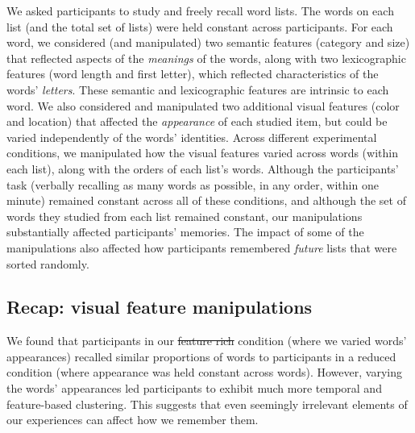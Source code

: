 \documentclass[11pt]{article}
\providecommand{\DIFaddtex}[1]{{\protect\color{blue}\uwave{#1}}} %
\providecommand{\DIFdeltex}[1]{{\protect\color{red}\sout{#1}}}                      %
\providecommand{\DIFaddbegin}{} %
\providecommand{\DIFaddend}{} %
\providecommand{\DIFdelbegin}{} %
\providecommand{\DIFdelend}{} %
\providecommand{\DIFadd}[1]{\texorpdfstring{\DIFaddtex{#1}}{#1}} %
\providecommand{\DIFdel}[1]{\texorpdfstring{\DIFdeltex{#1}}{}} %
\newcommand{\DIFscaledelfig}{0.5}
\newlength{\DIFdelgraphicswidth} %
\newlength{\DIFdelgraphicsheight} %
\newcommand{\DIFaddincludegraphics}[2][]{{\color{blue}\fbox{\DIFOincludegraphics[#1]{#2}}}} %
\newcommand{\DIFdelincludegraphics}[2][]{%
\sbox{\DIFdelgraphicsbox}{\DIFOincludegraphics[#1]{#2}}%
\settoboxwidth{\DIFdelgraphicswidth}{\DIFdelgraphicsbox} %
\settoboxtotalheight{\DIFdelgraphicsheight}{\DIFdelgraphicsbox} %
\scalebox{\DIFscaledelfig}{%
\parbox[b]{\DIFdelgraphicswidth}{\usebox{\DIFdelgraphicsbox}\\[-\baselineskip] \rule{\DIFdelgraphicswidth}{0em}}\llap{\resizebox{\DIFdelgraphicswidth}{\DIFdelgraphicsheight}{%
\setlength{\unitlength}{\DIFdelgraphicswidth}%
\begin{picture}(1,1)%
\thicklines\linethickness{2pt} %
{\color[rgb]{1,0,0}\put(0,0){\framebox(1,1){}}}%
{\color[rgb]{1,0,0}\put(0,0){\line( 1,1){1}}}%
{\color[rgb]{1,0,0}\put(0,1){\line(1,-1){1}}}%
\end{picture}%
}\hspace*{3pt}}} %
} %
\DeclareRobustCommand{\DIFaddbegin}{\DIFOaddbegin \let\includegraphics\DIFaddincludegraphics} %
\DeclareRobustCommand{\DIFaddend}{\DIFOaddend \let\includegraphics\DIFOincludegraphics} %
\DeclareRobustCommand{\DIFdelbegin}{\DIFOdelbegin \let\includegraphics\DIFdelincludegraphics} %
\DeclareRobustCommand{\DIFdelend}{\DIFOaddend \let\includegraphics\DIFOincludegraphics} %
\begin{document}

We asked participants to study and freely recall word lists. The words on each
list (and the total set of lists) were held constant across participants. For
each word, we considered (and manipulated) two semantic features (category and
size) that reflected aspects of the \textit{meanings} of the words, along with
two lexicographic features (word length and first letter), which reflected
characteristics of the words' \textit{letters}. These semantic and
lexicographic features are intrinsic to each word. We also considered and
manipulated two additional visual features (color and location) that affected
the \textit{appearance} of each studied item, but could be varied independently
of the words' identities. Across different experimental conditions, we
manipulated how the visual features varied across words (within each list),
along with the orders of each list's words. Although the participants' task
(verbally recalling as many words as possible, in any order, within one minute)
remained constant across all of these conditions, and although the set of words
they studied from each list remained constant, our manipulations substantially
affected participants' memories. The impact of some of the manipulations also
affected how participants remembered \textit{future} lists that were sorted
randomly.


\subsection*{Recap: visual feature manipulations}

We found that participants in our \DIFdelbegin \DIFdel{feature rich }\DIFdelend \DIFaddbegin \DIFadd{feature-rich }\DIFaddend condition (where we varied
words' appearances) recalled similar proportions of words to participants in a
reduced condition (where appearance was held constant across words). However,
varying the words' appearances led participants to exhibit much more temporal
and feature-based clustering. This suggests that even seemingly irrelevant
elements of our experiences can affect how we remember them.
\end{document}
